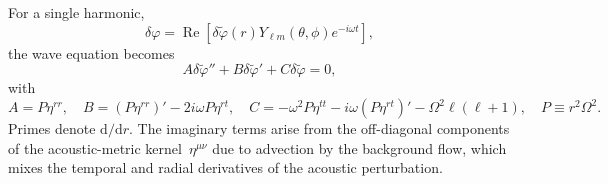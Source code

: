 \documentclass[12pt,a4paper,preprint,nopreprintline]{elsarticle}
\begin{document}
For a single harmonic,
\begin{equation}
    \delta\varphi
    =
    \operatorname{Re}
    \left[
        \delta\widetilde{\varphi}(r)Y_{\ell m}(\theta,\phi)e^{-i\omega t}
    \right],
    \label{eq:acoustic_separation}
\end{equation}
the wave equation becomes
\begin{equation}
    A\delta\widetilde{\varphi}''
    +B\delta\widetilde{\varphi}'
    +C\delta\widetilde{\varphi}=0,
    \label{eq:radial_master_equation}
\end{equation}
with
\begin{equation}
    A=P\eta^{rr},
    \quad
    B=(P\eta^{rr})'-2i\omega P\eta^{rt},
    \quad
    C=-\omega^{2}P\eta^{tt}
       -i\omega(P\eta^{rt})'
       -\Omega^{2}\ell(\ell+1),
    \quad
    P\equiv r^{2}\Omega^{2}.
    \label{eq:radial_coefficients}
\end{equation}
Primes denote $\mathrm{d}/\mathrm{d}r$. The imaginary terms arise from the off-diagonal components of the acoustic-metric kernel~$\eta^{\mu\nu}$ due to advection by the background flow, which mixes the temporal and radial derivatives of the acoustic perturbation.
\end{document}
